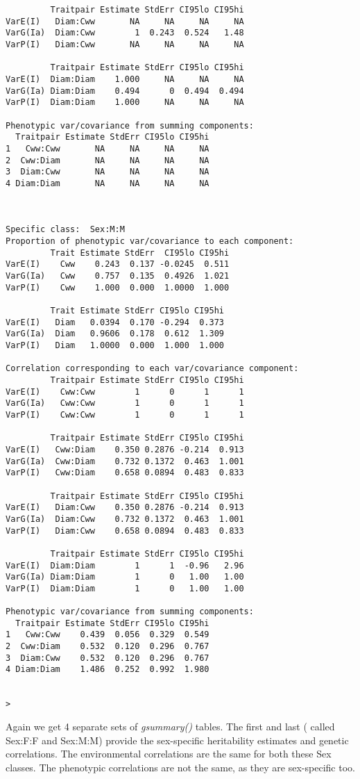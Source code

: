 \documentclass[titlepage]{article}  %
\begin{document}
\begin{verbatim}
         Traitpair Estimate StdErr CI95lo CI95hi
VarE(I)   Diam:Cww       NA     NA     NA     NA
VarG(Ia)  Diam:Cww        1  0.243  0.524   1.48
VarP(I)   Diam:Cww       NA     NA     NA     NA

         Traitpair Estimate StdErr CI95lo CI95hi
VarE(I)  Diam:Diam    1.000     NA     NA     NA
VarG(Ia) Diam:Diam    0.494      0  0.494  0.494
VarP(I)  Diam:Diam    1.000     NA     NA     NA

Phenotypic var/covariance from summing components:
  Traitpair Estimate StdErr CI95lo CI95hi
1   Cww:Cww       NA     NA     NA     NA
2  Cww:Diam       NA     NA     NA     NA
3  Diam:Cww       NA     NA     NA     NA
4 Diam:Diam       NA     NA     NA     NA



Specific class:  Sex:M:M 
Proportion of phenotypic var/covariance to each component:
         Trait Estimate StdErr  CI95lo CI95hi
VarE(I)    Cww    0.243  0.137 -0.0245  0.511
VarG(Ia)   Cww    0.757  0.135  0.4926  1.021
VarP(I)    Cww    1.000  0.000  1.0000  1.000

         Trait Estimate StdErr CI95lo CI95hi
VarE(I)   Diam   0.0394  0.170 -0.294  0.373
VarG(Ia)  Diam   0.9606  0.178  0.612  1.309
VarP(I)   Diam   1.0000  0.000  1.000  1.000

Correlation corresponding to each var/covariance component:
         Traitpair Estimate StdErr CI95lo CI95hi
VarE(I)    Cww:Cww        1      0      1      1
VarG(Ia)   Cww:Cww        1      0      1      1
VarP(I)    Cww:Cww        1      0      1      1

         Traitpair Estimate StdErr CI95lo CI95hi
VarE(I)   Cww:Diam    0.350 0.2876 -0.214  0.913
VarG(Ia)  Cww:Diam    0.732 0.1372  0.463  1.001
VarP(I)   Cww:Diam    0.658 0.0894  0.483  0.833

         Traitpair Estimate StdErr CI95lo CI95hi
VarE(I)   Diam:Cww    0.350 0.2876 -0.214  0.913
VarG(Ia)  Diam:Cww    0.732 0.1372  0.463  1.001
VarP(I)   Diam:Cww    0.658 0.0894  0.483  0.833

         Traitpair Estimate StdErr CI95lo CI95hi
VarE(I)  Diam:Diam        1      1  -0.96   2.96
VarG(Ia) Diam:Diam        1      0   1.00   1.00
VarP(I)  Diam:Diam        1      0   1.00   1.00

Phenotypic var/covariance from summing components:
  Traitpair Estimate StdErr CI95lo CI95hi
1   Cww:Cww    0.439  0.056  0.329  0.549
2  Cww:Diam    0.532  0.120  0.296  0.767
3  Diam:Cww    0.532  0.120  0.296  0.767
4 Diam:Diam    1.486  0.252  0.992  1.980


> 
\end{verbatim}
Again we get 4 separate sets of {\em gsummary()} tables.
The first and last ( called Sex:F:F and Sex:M:M) provide the sex-specific heritability estimates and genetic correlations. The environmental correlations are the same for both these Sex classes. The phenotypic correlations are not the same, as they are sex-specific too.
\end{document}
